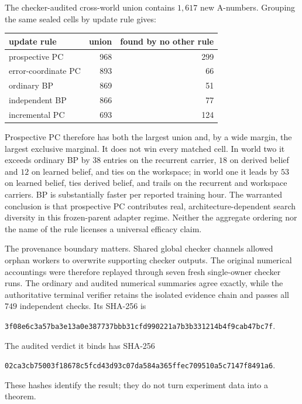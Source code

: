 \documentclass[11pt]{article}
\begin{document}
The checker-audited cross-world union contains $1{,}617$ new A-numbers. Grouping the
same sealed cells by update rule gives:

\begin{center}
\begin{tabular}{lrr}
\toprule
update rule & union & found by no other rule \\
\midrule
prospective PC & 968 & 299 \\
error-coordinate PC & 893 & 66 \\
ordinary BP & 869 & 51 \\
independent BP & 866 & 77 \\
incremental PC & 693 & 124 \\
\bottomrule
\end{tabular}
\end{center}

Prospective PC therefore has both the largest union and, by a wide margin, the largest
exclusive marginal. It does not win every matched cell. In world two it exceeds ordinary
BP by $38$ entries on the recurrent carrier, $18$ on derived belief and $12$ on learned
belief, and ties on the workspace; in world one it leads by $53$ on learned belief, ties
derived belief, and trails on the recurrent and workspace carriers. BP is substantially
faster per reported training hour. The warranted conclusion is that prospective PC
contributes real, architecture-dependent search diversity in this frozen-parent
adapter regime. Neither the aggregate ordering nor the name of the rule licenses a
universal efficacy claim.

The provenance boundary matters. Shared global checker channels allowed orphan workers
to overwrite supporting checker outputs. The original numerical accountings were
therefore replayed through seven fresh single-owner checker runs. The ordinary and
audited numerical summaries agree exactly, while the authoritative terminal verifier
retains the isolated evidence chain and passes all $749$ independent checks. Its
SHA-256 is
\begin{center}
{\scriptsize\nolinkurl{3f08e6c3a57ba3e13a0e387737bbb31cfd990221a7b3b331214b4f9cab47bc7f}}.
\end{center}
The audited verdict it binds has SHA-256
\begin{center}
{\scriptsize\nolinkurl{02ca3cb75003f18678c5fcd43d93c07da584a365ffec709510a5c7147f8491a6}}.
\end{center}
These hashes identify the result; they do not turn experiment data into a theorem.
\end{document}
